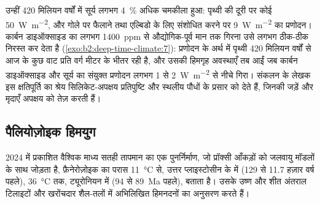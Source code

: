 \begin{omfigure}
\par{}
\end{omfigure}

उन्हीं 420 मिलियन वर्षों में सूर्य लगभग \qty{4}{\percent} अधिक चमकीला हुआ: पृथ्वी की दूरी पर कोई
\qty{50}{W.m^{-2}}, और गोले पर फैलाने तथा एल्बिडो के लिए संशोधित करने पर \qty{9}{W.m^{-2}} का प्रणोदन।
कार्बन डाइऑक्साइड का लगभग \qty{1400}{ppm} से औद्योगिक-पूर्व मान तक गिरना उसे लगभग ठीक-ठीक
निरस्त कर देता है (\cref{exo:b2:deep-time-climate:7}): प्रणोदन के अर्थ में पृथ्वी 420 मिलियन वर्षों से
आज के कुछ वाट प्रति वर्ग मीटर के भीतर रही है, और उसकी हिमगृह अवस्थाएँ तब आईं जब कार्बन डाइऑक्साइड
और सूर्य का संयुक्त प्रणोदन लगभग 1 से \qty{2}{W.m^{-2}} से नीचे गिरा। संकलन के लेखक इस क्षतिपूर्ति
का श्रेय सिलिकेट-अपक्षय प्रतिपुष्टि और स्थलीय पौधों के प्रसार को देते हैं, जिनकी जड़ें और मृदाएँ
अपक्षय को तेज़ करती हैं।

\subsection*{पैलियोज़ोइक हिमयुग}

2024 में प्रकाशित वैश्विक माध्य सतही तापमान का एक पुनर्निर्माण, जो प्रॉक्सी आँकड़ों को जलवायु मॉडलों के
साथ जोड़ता है, फ़ैनेरोज़ोइक का परास \qty{11}{\celsius} से, उत्तर प्लाइस्टोसीन के  में (129 से
11.7 हज़ार वर्ष पहले), \qty{36}{\celsius} तक, ट्यूरोनियन में (94 से \qty{89}{Ma} पहले), बताता है।
उसके उष्ण और शीत अंतराल टिलाइटों और खरोंचदार शैल-तलों में अभिलिखित हिमनदनों का अनुसरण करते हैं।

